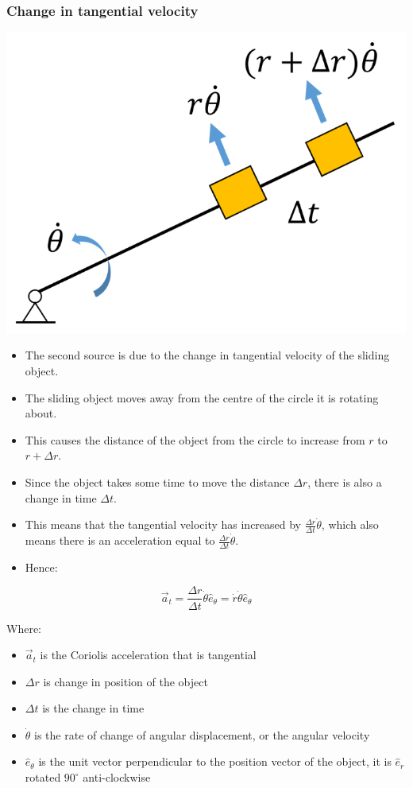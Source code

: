 \documentclass[11pt]{article}
\begin{document}
\subsubsection{Change in tangential velocity}
\label{sec:org07cde48}
\begin{center}
\includegraphics[scale=0.62]{./images/change-in-tangential-velocity-coriolis-acceleration.png}
\end{center}
\begin{itemize}
\item The second source is due to the change in tangential velocity of the sliding object.
\item The sliding object moves away from the centre of the circle it is rotating about.
\item This causes the distance of the object from the circle to increase from \(r\) to \(r + \Delta r\).
\item Since the object takes some time to move the distance \(\Delta r\), there is also a change in time \(\Delta t\).
\item This means that the tangential velocity has increased by \(\frac{\Delta r}{\Delta t} \dot{\theta}\), which also means there is an acceleration equal to \(\frac{\Delta r}{\Delta t} \dot{\theta}\).
\item Hence:
\end{itemize}

\[\vec{a}_t = \frac{\Delta r}{\Delta t} \dot{\theta} \hat{e}_{\theta} = \dot{r} \dot{\theta} \hat{e}_{\theta}\]

Where:
\begin{itemize}
\item \(\vec{a}_t\) is the Coriolis acceleration that is tangential
\item \(\Delta r\) is change in position of the object
\item \(\Delta t\) is the change in time
\item \(\dot{\theta}\) is the rate of change of angular displacement, or the angular velocity
\item \(\hat{e}_{\theta}\) is the unit vector perpendicular to the position vector of the object, it is \(\hat{e}_r\) rotated \(90^{\circ}\) anti-clockwise
\end{itemize}
\end{document}
